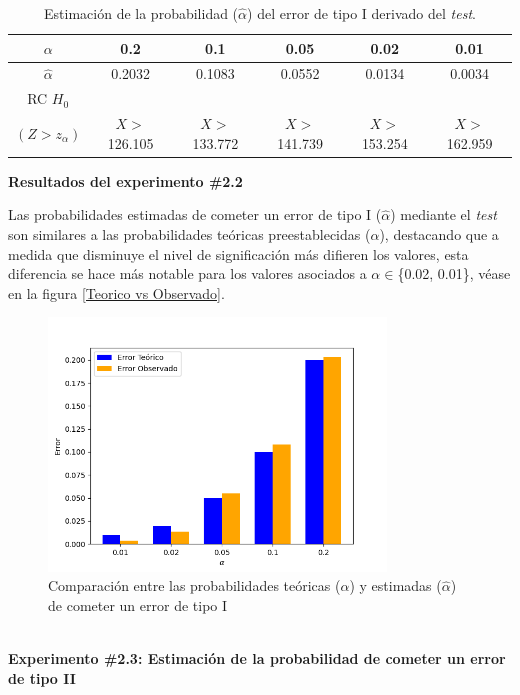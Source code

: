 \documentclass[12pt]{report}
\begin{document}
\begin{table}[h!]
	\centering
	\begin{tabular}{|c|ccccc|}
		\hline
		$\alpha$ &  0.2 & 0.1 & 0.05 & 0.02 &  0.01 \\
		\hline
		$\hat{\alpha}$ & 0.2032 & 0.1083 & 0.0552 & 0.0134 & 0.0034 \\
		\hline
		RC $H_0$  &		&				&			&			&\\
		$(Z>z_\alpha)$&$X>$126.105& $X>$133.772& $X>$141.739& $X>$153.254& $X>$162.959 \\
		\hline
	\end{tabular}
	\caption{Estimación de la probabilidad ($\hat{\alpha}$) del error de tipo I derivado del \textit{test}.}
	\label{tab:error1-prob1}
\end{table}

\textbf{Resultados del experimento \#2.2}

Las probabilidades estimadas de cometer un error de tipo I ($\hat{\alpha}$) mediante el \textit{test} son similares a las probabilidades teóricas preestablecidas ($\alpha$), destacando que a medida que disminuye el nivel de significación más difieren los valores, esta diferencia se hace más notable para los valores asociados a $\alpha \in$\{0.02, 0.01\}, véase en la figura \ref{Teorico vs Observado}.
\begin{figure}[ht]
	\centering
	
	\includegraphics[width=0.8\textwidth]{4td_teo_obs.png}
	\caption{Comparación entre las probabilidades teóricas ($\alpha$) y estimadas ($\hat{\alpha}$) de cometer un error de tipo I }
	\label{Teorico vs Observado1}
\end{figure}\\

\textbf{Experimento \#2.3: Estimación de la probabilidad de cometer un error de tipo II}
\end{document}
